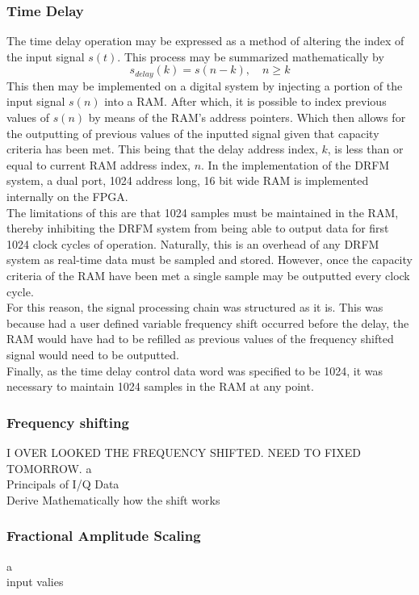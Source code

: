 	\subsubsection{Time Delay}
	 The time delay operation may be expressed as a method of altering the index of the input signal $s(t)$. This process may be summarized mathematically by
	\begin{equation}
		s_{delay}(k) = s(n -k),\quad n \geq k
	\end{equation}
	 \noindent This then may be implemented on a digital system by injecting a portion of the input signal $s(n)$ into a RAM. After which, it is possible to index previous values of $s(n)$ by means of the RAM's address pointers. Which then allows for the outputting of previous values of the inputted signal given that capacity criteria has been met. This being that the delay address index, $k$, is less than or equal to current RAM address index, $n$. In the implementation of the DRFM system, a dual port, 1024 address long, 16 bit wide RAM is implemented internally on the FPGA. \\ \newline The limitations of this are that 1024 samples must be maintained in the RAM, thereby inhibiting the DRFM system from being able to output data for first 1024 clock cycles of operation. Naturally, this is an overhead of any DRFM system as real-time data must be sampled and stored. However, once the capacity criteria of the RAM have been met a single sample may be outputted every clock cycle. \\ \newline For this reason, the signal processing chain was structured as it is. This was because had a user defined variable frequency shift occurred before the delay, the RAM would have had to be refilled as previous values of the frequency shifted signal would need to be outputted.  \\ \newline Finally, as the time delay control data word was specified to be 1024, it was necessary to maintain 1024 samples in the RAM at any point.\\
	\subsubsection{Frequency shifting}
	
		{ \color{red}  I OVER LOOKED THE FREQUENCY SHIFTED. NEED TO FIXED TOMORROW. }
		a \\ Principals of I/Q Data \\ Derive Mathematically how the shift works \\ 
	
	\subsubsection{Fractional Amplitude Scaling}
		a \\ input valies

	
	



